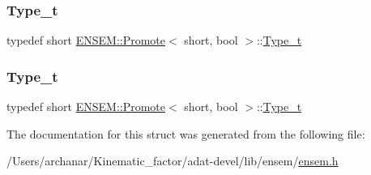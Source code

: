 \mbox{\label{structENSEM_1_1Promote_3_01short_00_01bool_01_4_a4f58ddab80108afc16273b6a677fcdaf}} 
\subsubsection{\texorpdfstring{Type\_t}{Type\_t}\hspace{0.1cm}{\footnotesize\ttfamily [2/3]}}
{\footnotesize\ttfamily typedef short \mbox{\hyperlink{structENSEM_1_1Promote}{E\+N\+S\+E\+M\+::\+Promote}}$<$ short, bool $>$\+::\mbox{\hyperlink{structENSEM_1_1Promote_3_01short_00_01bool_01_4_a4f58ddab80108afc16273b6a677fcdaf}{Type\+\_\+t}}}

\mbox{\label{structENSEM_1_1Promote_3_01short_00_01bool_01_4_a4f58ddab80108afc16273b6a677fcdaf}} 
\subsubsection{\texorpdfstring{Type\_t}{Type\_t}\hspace{0.1cm}{\footnotesize\ttfamily [3/3]}}
{\footnotesize\ttfamily typedef short \mbox{\hyperlink{structENSEM_1_1Promote}{E\+N\+S\+E\+M\+::\+Promote}}$<$ short, bool $>$\+::\mbox{\hyperlink{structENSEM_1_1Promote_3_01short_00_01bool_01_4_a4f58ddab80108afc16273b6a677fcdaf}{Type\+\_\+t}}}



The documentation for this struct was generated from the following file\+:\begin{DoxyCompactItemize}
\item 
/\+Users/archanar/\+Kinematic\+\_\+factor/adat-\/devel/lib/ensem/\mbox{\hyperlink{adat-devel_2lib_2ensem_2ensem_8h}{ensem.\+h}}\end{DoxyCompactItemize}
